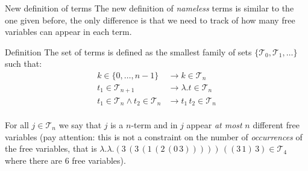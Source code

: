 \documentclass[8pt]{beamer}
\begin{document}
\begin{frame}{New definition of terms}
    The new definition of \emph{nameless} terms is similar to the one given 
    before, the only difference is that we need to track of how many free
    variables can appear in each term.

    \begin{block}{Definition}
        The set of terms is defined as the smallest family of sets
        $\{\mathcal{T}_{0},\mathcal{T}_{1},\ldots\}$ such that:
        \begin{displaymath}  
           \begin{split} 
                k \in \{0, \ldots, n-1\} &\rightarrow k \in \mathcal{T}_n  \\
                t_{1} \in \mathcal{T}_{n+1} &\rightarrow \lambda.t \in \mathcal{T}_n  \\
                t_{1} \in \mathcal{T}_{n} \wedge t_{2} \in \mathcal{T}_{n}
                    &\rightarrow t_{1} \, t_{2} \in \mathcal{T}_n  \\
           \end{split} 
        \end{displaymath}  
    \end{block}
    For all $j \in \mathcal{T}_n$ we say that $j$ is a $n$-term and in $j$ 
    appear \emph{at most} $n$ different free variables (pay attention: this is
    not a constraint on the number of \emph{occurrences} of the free variables, that is
    $\lambda.\lambda.(3\, (3\, (1\, (2\, (0\, 3)))))\, ((3\, 1)\, 3) 
        \in \mathcal{T}_{4}$ where there are 6 free variables).
\end{frame}
\end{document}
